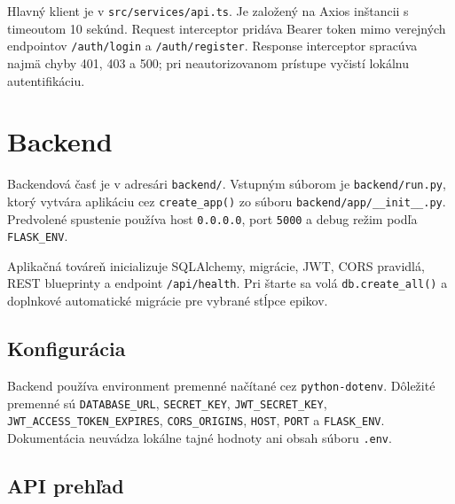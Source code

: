 ﻿\documentclass[12pt,a4paper]{article}
\begin{document}
Hlavný klient je v \texttt{src/services/api.ts}. Je založený na Axios inštancii s timeoutom 10 sekúnd. Request interceptor pridáva Bearer token mimo verejných endpointov \texttt{/auth/login} a \texttt{/auth/register}. Response interceptor spracúva najmä chyby 401, 403 a 500; pri neautorizovanom prístupe vyčistí lokálnu autentifikáciu.

\section{Backend}

Backendová časť je v adresári \texttt{backend/}. Vstupným súborom je \texttt{backend/run.py}, ktorý vytvára aplikáciu cez \texttt{create\_app()} zo súboru \texttt{backend/app/\_\_init\_\_.py}. Predvolené spustenie používa host \texttt{0.0.0.0}, port \texttt{5000} a debug režim podľa \texttt{FLASK\_ENV}.

Aplikačná továreň inicializuje SQLAlchemy, migrácie, JWT, CORS pravidlá, REST blueprinty a endpoint \texttt{/api/health}. Pri štarte sa volá \texttt{db.create\_all()} a doplnkové automatické migrácie pre vybrané stĺpce epikov.

\subsection{Konfigurácia}

Backend používa environment premenné načítané cez \texttt{python-dotenv}. Dôležité premenné sú \texttt{DATABASE\_URL}, \texttt{SECRET\_KEY}, \texttt{JWT\_SECRET\_KEY}, \texttt{JWT\_ACCESS\_TOKEN\_EXPIRES}, \texttt{CORS\_ORIGINS}, \texttt{HOST}, \texttt{PORT} a \texttt{FLASK\_ENV}. Dokumentácia neuvádza lokálne tajné hodnoty ani obsah súboru \texttt{.env}.

\subsection{API prehľad}
\end{document}
